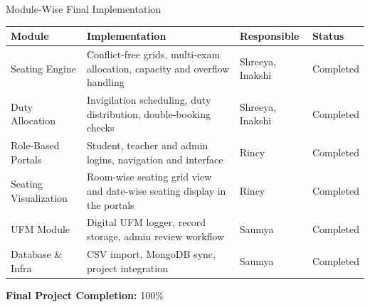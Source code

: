 \documentclass[aspectratio=169,11pt]{beamer}
\begin{document}
\begin{frame}{Module-Wise Final Implementation}

\scriptsize

\begin{center}

\renewcommand{\arraystretch}{1.0}

\begin{tabularx}{.96\textwidth}
{@{}p{2.7cm}X p{2.5cm}p{1.5cm}@{}}

\toprule
\textbf{Module} &
\textbf{Implementation} &
\textbf{Responsible} &
\textbf{Status}\\
\midrule

Seating Engine &
Conflict-free grids, multi-exam allocation, capacity and overflow handling &
Shreeya, Inakshi &
Completed\\

Duty Allocation &
Invigilation scheduling, duty distribution, double-booking checks &
Shreeya, Inakshi &
Completed\\

Role-Based Portals &
Student, teacher and admin logins, navigation and interface &
Rincy &
Completed\\

Seating Visualization &
Room-wise seating grid view and date-wise seating display in the portals &
Rincy &
Completed\\

UFM Module &
Digital UFM logger, record storage, admin review workflow &
Saumya &
Completed\\

Database \& Infra &
CSV import, MongoDB sync, project integration &
Saumya &
Completed\\

\bottomrule

\end{tabularx}

\end{center}

\vspace{0mm}

\begin{center}
\colorbox{GEULightBlue}{
\parbox{.65\textwidth}{
\centering
\textbf{Final Project Completion:} 100\%
}}
\end{center}

\end{frame}
\end{document}
